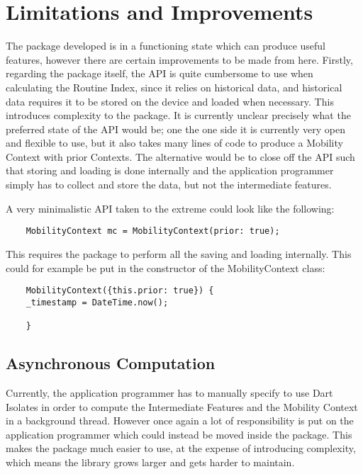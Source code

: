 \section{Limitations and Improvements}
The package developed is in a functioning state which can produce useful features, however there are certain improvements to be made from here. Firstly, regarding the package itself, the API is quite cumbersome to use when calculating the Routine Index, since it relies on historical data, and historical data requires it to be stored on the device and loaded when necessary. This introduces complexity to the package. It is currently unclear precisely what the preferred state of the API would be; one the one side it is currently very open and flexible to use, but it also takes many lines of code to produce a Mobility Context with prior Contexts. The alternative would be to close off the API such that storing and loading is done internally and the application programmer simply has to collect and store the data, but not the intermediate features. 

A very minimalistic API taken to the extreme could look like the following:

\begin{verbatim}
    MobilityContext mc = MobilityContext(prior: true);
\end{verbatim}

This requires the package to perform all the saving and loading internally. This could for example be put in the constructor of the MobilityContext class:

\begin{verbatim}
    MobilityContext({this.prior: true}) {
    _timestamp = DateTime.now();
    
    }
\end{verbatim}

\subsection{Asynchronous Computation}
Currently, the application programmer has to manually specify to use Dart Isolates in order to compute the Intermediate Features and the Mobility Context in a background thread. However once again a lot of responsibility is put on the application programmer which could instead be moved inside the package. This makes the package much easier to use, at the expense of introducing complexity, which means the library grows larger and gets harder to maintain.

